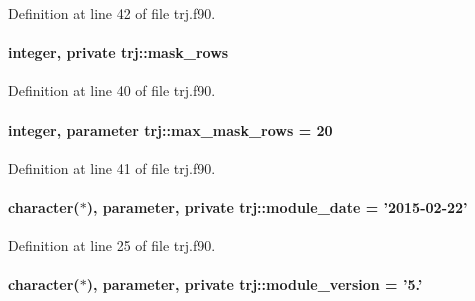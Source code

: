 Definition at line 42 of file trj.\-f90.

\hypertarget{classtrj_a7c93922f84f1c169722dd8f2d0417f58}{
\paragraph[{mask\-\_\-rows}]{\setlength{\rightskip}{0pt plus 5cm}integer, private trj\-::mask\-\_\-rows\hspace{0.3cm}{\ttfamily [private]}}}\label{classtrj_a7c93922f84f1c169722dd8f2d0417f58}


Definition at line 40 of file trj.\-f90.

\hypertarget{classtrj_a82dde4806006cf7789887e849dae4443}{
\paragraph[{max\-\_\-mask\-\_\-rows}]{\setlength{\rightskip}{0pt plus 5cm}integer, parameter trj\-::max\-\_\-mask\-\_\-rows = 20}}\label{classtrj_a82dde4806006cf7789887e849dae4443}


Definition at line 41 of file trj.\-f90.

\hypertarget{classtrj_a1ad7018116ab14c2fd3f3fde2792055d}{
\paragraph[{module\-\_\-date}]{\setlength{\rightskip}{0pt plus 5cm}character($\ast$), parameter, private trj\-::module\-\_\-date = '2015-\/02-\/22'\hspace{0.3cm}{\ttfamily [private]}}}\label{classtrj_a1ad7018116ab14c2fd3f3fde2792055d}


Definition at line 25 of file trj.\-f90.

\hypertarget{classtrj_a2865e4831781f2cf03f656976cdf17e0}{
\paragraph[{module\-\_\-version}]{\setlength{\rightskip}{0pt plus 5cm}character($\ast$), parameter, private trj\-::module\-\_\-version = '5.'\hspace{0.3cm}{\ttfamily [private]}}}\label{classtrj_a2865e4831781f2cf03f656976cdf17e0}


